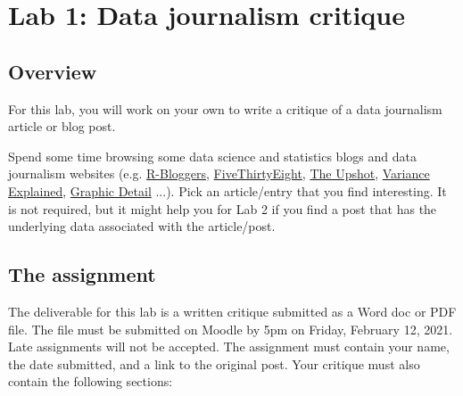 \documentclass{article}\usepackage[]{graphicx}\usepackage[]{color}
\begin{document}

\section*{Lab 1: Data journalism critique}

\subsection*{Overview}
For this lab, you will work on your own to write a critique of a data journalism article or blog post. 

Spend some time browsing some data science and statistics blogs and data journalism websites (e.g. \href{https://www.r-bloggers.com/}{R-Bloggers}, \href{http://fivethirtyeight.com/}{FiveThirtyEight}, \href{https://www.nytimes.com/section/upshot}{The Upshot}, \href{http://varianceexplained.org/}{Variance Explained}, \href{https://www.economist.com/graphic-detail/}{Graphic Detail} ...). Pick an article/entry that you find interesting. It is not required, but it might help you for Lab 2 if you find a post that has the underlying data associated with the article/post. 

\subsection*{The assignment}
The deliverable for this lab is a written critique submitted as a Word doc or PDF file. The file must be submitted on Moodle by 5pm on Friday, February 12, 2021. Late assignments will not be accepted. The assignment must contain your name, the date submitted, and a link to the original post. Your critique must also contain the following sections:
\end{document}
